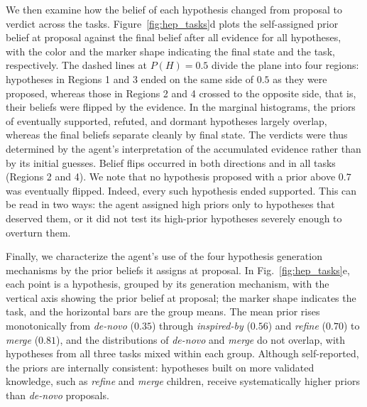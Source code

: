 We then examine how the belief of each hypothesis changed from proposal
to verdict across the tasks.
Figure~\ref{fig:hep_tasks}d plots the self-assigned prior belief at
proposal against the final belief after all evidence for all
hypotheses, with the color and the marker shape indicating the final
state and the task, respectively.
The dashed lines at $P(H)=0.5$ divide the plane into four regions:
hypotheses in Regions 1 and 3 ended on the same side of $0.5$ as they
were proposed, whereas those in Regions 2 and 4 crossed to the opposite
side, that is, their beliefs were flipped by the evidence.
In the marginal histograms, the priors of eventually supported,
refuted, and dormant hypotheses largely overlap, whereas the final
beliefs separate cleanly by final state.
The verdicts were thus determined by the agent's interpretation of the
accumulated evidence rather than by its initial guesses.
Belief flips occurred in both directions and in all tasks
(Regions 2 and 4).
We note that no hypothesis proposed with a prior above $0.7$ was
eventually flipped.
Indeed, every such hypothesis ended supported.
This can be read in two ways: the agent assigned high priors only to
hypotheses that deserved them, or it did not test its high-prior
hypotheses severely enough to overturn them.

Finally, we characterize the agent's use of the four hypothesis
generation mechanisms by the prior beliefs it assigns at proposal.
In Fig.~\ref{fig:hep_tasks}e, each point is a hypothesis, grouped by
its generation mechanism, with the vertical axis showing the prior
belief at proposal; the marker shape indicates the task, and the
horizontal bars are the group means.
The mean prior rises monotonically from \emph{de-novo} ($0.35$) through
\emph{inspired-by} ($0.56$) and \emph{refine} ($0.70$) to \emph{merge}
($0.81$), and the distributions of \emph{de-novo} and \emph{merge} do
not overlap, with hypotheses from all three tasks mixed within each
group.
Although self-reported, the priors are internally consistent:
hypotheses built on more validated knowledge, such as \emph{refine} and
\emph{merge} children, receive systematically higher priors than
\emph{de-novo} proposals.

